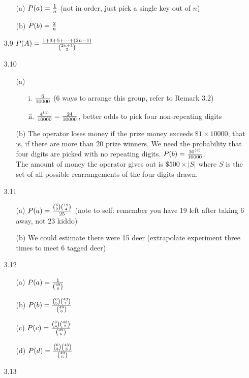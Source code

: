 \documentclass[english, 11pt]{article}
\begin{document}
\begin{itemize}
\begin{itemize}
      \item[(a)] $P(a) = \frac{1}{n}$ (not in order, just pick a single key out of $n$)
      \item[(b)] $P(b) = \frac{2}{n}$
    \end{itemize}
    \item[3.9]
    $P(A) = \frac{1 + 3 + 5 + \cdots +  (2n-1)}{{2n+1 \choose 3}}$
    \item[3.10]
    \begin{itemize}
      \item[(a)]
      \begin{itemize}
        \item[i.] $\frac{6}{10000}$ (6 ways to arrange this group, refer to Remark 3.2)
        \item[ii.] $\frac{4^{(4)}}{10000} = \frac{24}{10000}$, better odds to pick four non-repeating digits
      \end{itemize}
      \item[(b)] The operator loses money if the prize money exceeds $\$ 1 \times 10000$, that is, if there are more than $20$ prize winners. We need the probability that four digits are picked with no repeating digits. $P(b) = \frac{10^{(4)}}{10000}$. \\
      The amount of money the operator gives out is $\$500 \times |S|$ where $S$ is the set of all possible rearrangements of the four digits drawn.
    \end{itemize}
    \item[3.11]
    \begin{itemize}
      \item[(a)] $P(a) = \frac{{6 \choose 2}{19 \choose 4}}{25}$ (note to self: remember you have 19 left after taking 6 away, not 23 kiddo)
      \item[(b)] We could estimate there were 15 deer (extrapolate experiment three times to meet 6 tagged deer)
    \end{itemize}
    \item[3.12]
    \begin{itemize}
      \item[(a)] $P(a) = \frac{1}{{49 \choose 6}}$
      \item[(b)] $P(b) = \frac{{6 \choose 5}{43 \choose 1}}{{49 \choose 6}}$
      \item[(c)] $P(c) = \frac{{6 \choose 4}{43 \choose 2}}{{49 \choose 6}}$
      \item[(d)] $P(d) = \frac{{6 \choose 3}{43 \choose 3}}{{49 \choose 6}}$
    \end{itemize}
    \item[3.13]

\end{itemize}
\end{document}
